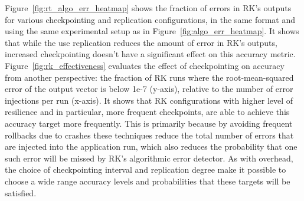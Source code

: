 \documentclass{sig-alternate}
\begin{document}
Figure~\ref{fig:rt_algo_err_heatmap} shows the fraction of errors in RK's outputs for various checkpointing and replication configurations, in the same format and using the same experimental setup as in Figure~\ref{fig:algo_err_heatmap}.
It shows that while the use replication reduces the amount of error in RK's outputs, increased checkpointing doesn't have a significant effect on this accuracy metric.
Figure~\ref{fig:rk_effectiveness} evaluates the effect of checkpointing on accuracy from another perspective: the fraction of RK runs where the root-mean-squared error of the output vector is below 1e-7 (y-axis), relative to the number of error injections per run (x-axis).
It shows that RK configurations with higher level of resilience and in particular, more frequent checkpoints, are able to achieve this accuracy target more frequently.
This is primarily because by avoiding frequent rollbacks due to crashes these techniques reduce the total number of errors that are injected into the application run, which also reduces the probability that one such error will be missed by RK's algorithmic error detector.
As with overhead, the choice of checkpointing interval and replication degree make it possible to choose a wide range accuracy levels and probabilities that these targets will be satisfied.
\end{document}

